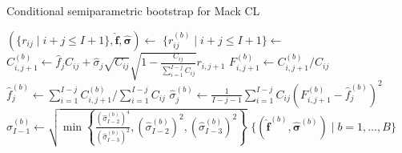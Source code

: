 \documentclass[a4paper]{book}
\begin{document}
\begin{algorithm}[!htb]
  \caption{Conditional semiparametric bootstrap for Mack CL} 
  \label{alg:cond-semiparam-mack}
  \begin{algorithmic} 
    \vspace{3.5pt}
    \State $(\{ r_{ij} \mid i + j \leq I + 1 \}, \bm{\widehat{f}}, \bm{\widehat{\sigma}}) \gets$  
    \vspace{3.5pt}
      \vspace{3.5pt}
      \State $\{ r^{(b)}_{ij} \mid i + j \leq I + 1 \} \gets$ 
      \vspace{3.5pt}
          \vspace{3.5pt}
          \State $C^{(b)}_{i, j + 1} \gets \widehat{f}_j C_{ij} + \widehat{\sigma}_j \sqrt{C_{ij}} \sqrt{1 - \frac{{C_{ij}}}{\sum_{i = 1}^{I - j} C_{ij}}} r_{i, j + 1}$
          \vspace{3.5pt}
          \State $\displaystyle F^{(b)}_{i, j + 1} \gets C^{(b)}_{i, j + 1} / C_{ij}$
          \vspace{3.5pt}
        \EndFor
        \vspace{3.5pt}
        \State $\widehat{f}^{(b)}_j \gets \sum_{i = 1}^{I - j} C^{(b)}_{i, j + 1} / \sum_{i = 1}^{I - j} C_{ij}$
        \vspace{3.5pt}
          \vspace{3.5pt}
          \State $\displaystyle \widehat{\sigma}^{(b)}_j \gets \frac{1}{I - j - 1}\sum_{i = 1}^{I - j} C_{ij} \left( F^{(b)}_{i, j + 1} - \widehat{f}^{(b)}_j \right)^2$
          \vspace{3.5pt}
        \Else
          \vspace{3.5pt}
          \State $\widehat{\sigma}^{(b)}_{I - 1} \gets \sqrt{\min{ \left \{ \displaystyle \frac{(\widehat{\sigma}^{(b)}_{I - 2})^4}{(\widehat{\sigma}^{(b)}_{I - 3})^2}, (\widehat{\sigma}^{(b)}_{I - 2})^2, (\widehat{\sigma}^{(b)}_{I - 3})^2 \right \} }}$
          \vspace{3.5pt}
          \EndIf
        \EndFor
    \EndFor
    \State \Return $\{ (\widehat{\bm{f}}^{(b)}, \widehat{\bm{\sigma}}^{(b)}) \mid b = 1, \dots, B \}$
  \end{algorithmic}
\end{algorithm}
%
\end{document}
